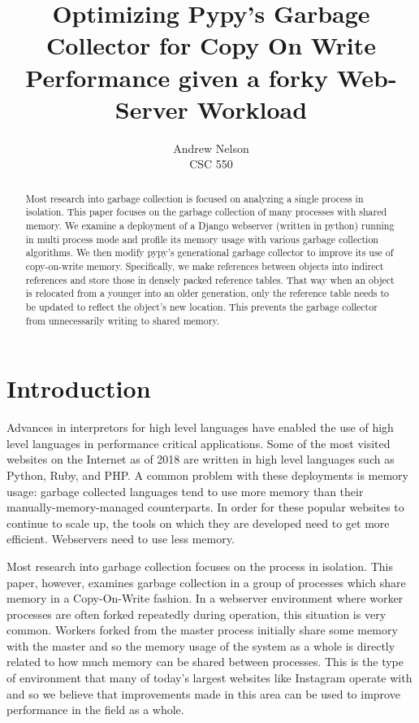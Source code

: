 \documentclass{article}
\begin{document}
\begin{titlepage}
    \title{Optimizing Pypy's Garbage Collector for Copy On Write Performance given a forky Web-Server Workload}
    \author{Andrew Nelson\\CSC 550}

    \maketitle

    \begin{abstract}
        Most research into garbage collection is focused on analyzing a single process in isolation.  This paper focuses on the garbage collection of many processes with shared memory.  We examine a deployment of a Django webserver (written in python) running in multi process mode and profile its memory usage with various garbage collection algorithms.  We then modify pypy's generational garbage collector to improve its use of copy-on-write memory.  Specifically, we make references between objects into indirect references and store those in densely packed reference tables.  That way when an object is relocated from a younger into an older generation, only the reference table needs to be updated to reflect the object's new location.  This prevents the garbage collector from unnecessarily writing to shared memory.  
    \end{abstract}
\end{titlepage}

\newpage

\tableofcontents

\newpage
{}
\twocolumn


\section{Introduction}
Advances in interpretors for high level languages have enabled the use of high level languages in performance critical applications.  Some of the most visited websites on the Internet as of 2018 are written in high level languages such as Python, Ruby, and PHP.  A common problem with these deployments is memory usage: garbage collected languages tend to use more memory than their manually-memory-managed counterparts. In order for these popular websites to continue to scale up, the tools on which they are developed need to get more efficient.  Webservers need to use less memory.

Most research into garbage collection focuses on the process in isolation.  This paper, however, examines garbage collection in a group of processes which share memory in a Copy-On-Write fashion.  In a webserver environment where worker processes are often forked repeatedly during operation, this situation is very common.  Workers forked from the master process initially share some memory with the master and so the memory usage of the system as a whole is directly related to how much memory can be shared between processes.  This is the type of environment that many of today's largest websites like Instagram\cite{dismissing_garbage} operate with and so we believe that improvements made in this area can be used to improve performance in the field as a whole.
\end{document}
